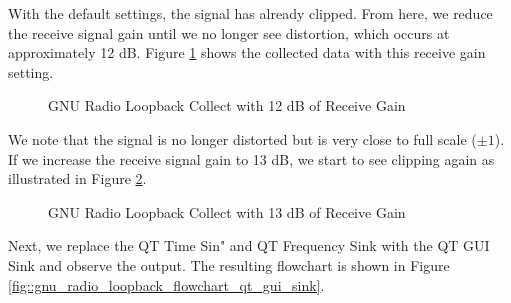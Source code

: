 \documentclass{article}
\begin{document}
With the default settings, the signal has already clipped. From here, we reduce the receive signal gain until we no longer see distortion, which occurs at approximately 12 dB. Figure \ref{fig::gnu_radio_loopback_rx_gain_12dB} shows the collected data with this receive gain setting.

\begin{figure}[H]
	\centerline{}
	\caption{GNU Radio Loopback Collect with 12 dB of Receive Gain}
	\label{fig::gnu_radio_loopback_rx_gain_12dB}
\end{figure}

We note that the signal is no longer distorted but is very close to full scale ($\pm 1$). If we increase the receive signal gain to 13 dB, we start to see clipping again as illustrated in Figure \ref{fig::gnu_radio_loopback_rx_gain_13dB}.

\begin{figure}[H]
	\centerline{}
	\caption{GNU Radio Loopback Collect with 13 dB of Receive Gain}
	\label{fig::gnu_radio_loopback_rx_gain_13dB}
\end{figure}

Next, we replace the QT Time Sin" and QT Frequency Sink with the QT GUI Sink and observe the output. The resulting flowchart is shown in Figure \ref{fig::gnu_radio_loopback_flowchart_qt_gui_sink}.
\end{document}
